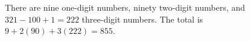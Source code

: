 There are nine one-digit numbers, ninety two-digit numbers, and $ 321-100+1=222 $ three-digit numbers. The total is $ 9+2(90)+3(222)=\boxed{855}$.
